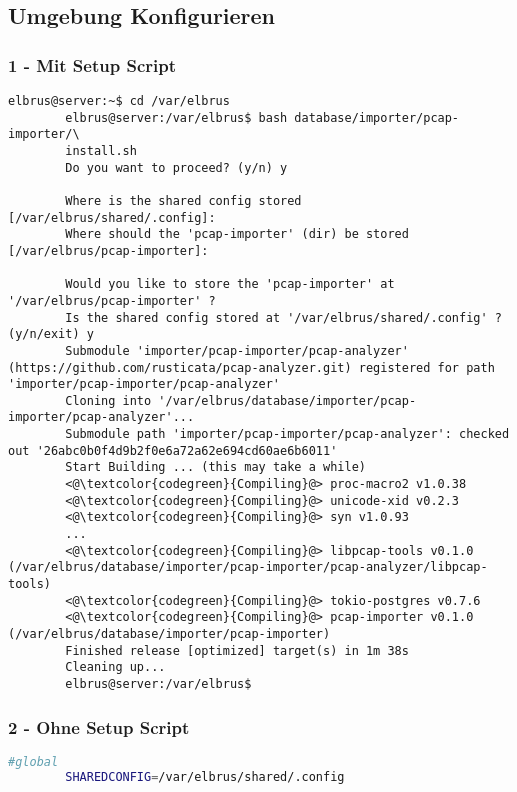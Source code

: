 	\subsection[file config]{Umgebung Konfigurieren}
	\subsubsection{1 - Mit Setup Script}
	
	\lstset{style=commands}
	\begin{lstlisting}[caption={Ausführen des 'install.sh' Scripts.}, breaklines=true,]
		elbrus@server:~$ cd /var/elbrus
		elbrus@server:/var/elbrus$ bash database/importer/pcap-importer/\
		install.sh
		Do you want to proceed? (y/n) y
		
		Where is the shared config stored [/var/elbrus/shared/.config]: 
		Where should the 'pcap-importer' (dir) be stored [/var/elbrus/pcap-importer]: 
		
		Would you like to store the 'pcap-importer' at '/var/elbrus/pcap-importer' ?
		Is the shared config stored at '/var/elbrus/shared/.config' ? (y/n/exit) y
		Submodule 'importer/pcap-importer/pcap-analyzer' (https://github.com/rusticata/pcap-analyzer.git) registered for path 'importer/pcap-importer/pcap-analyzer'
		Cloning into '/var/elbrus/database/importer/pcap-importer/pcap-analyzer'...
		Submodule path 'importer/pcap-importer/pcap-analyzer': checked out '26abc0b0f4d9b2f0e6a72a62e694cd60ae6b6011'
		Start Building ... (this may take a while)
		<@\textcolor{codegreen}{Compiling}@> proc-macro2 v1.0.38
		<@\textcolor{codegreen}{Compiling}@> unicode-xid v0.2.3
		<@\textcolor{codegreen}{Compiling}@> syn v1.0.93
		...
		<@\textcolor{codegreen}{Compiling}@> libpcap-tools v0.1.0 (/var/elbrus/database/importer/pcap-importer/pcap-analyzer/libpcap-tools)
		<@\textcolor{codegreen}{Compiling}@> tokio-postgres v0.7.6
		<@\textcolor{codegreen}{Compiling}@> pcap-importer v0.1.0 (/var/elbrus/database/importer/pcap-importer)
		Finished release [optimized] target(s) in 1m 38s
		Cleaning up...
		elbrus@server:/var/elbrus$
	\end{lstlisting}
	\newpage
	
	\subsubsection{2 - Ohne Setup Script}	
	
	\lstset{style=files}
	\begin{lstlisting}[caption={Anhand von '.env.example' eigene '.env' Datei anlegen.}, language=bash]
		#global
		SHAREDCONFIG=/var/elbrus/shared/.config
	\end{lstlisting}
	
